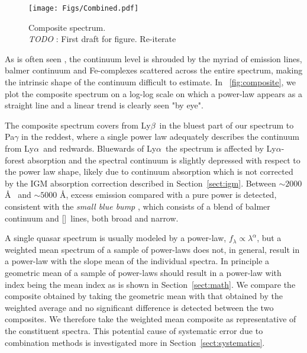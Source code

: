 \documentclass{aa}    %
\newcommand{\figref}[1]{\ref{fig:#1}}
\newcommand{\Fig}[1]{\figurename~\figref{#1}}
\newcommand{\fig}[1]{\Fig{#1}}
\newcommand{\figlabel}[1]{\label{fig:#1}}
\newcommand{\sectionname}{Section}
\newcommand{\Sect}[1]{\sectionname~\ref{sect:#1}}
\newcommand{\sect}[1]{\Sect{#1}}
\newcommand{\lya}{Ly$\alpha$}
\newcommand{\lyb}{Ly$\beta$}
\newcommand{\feii}{[\ion{Fe}{ii}]}
\newcommand{\todo}[3]{{\color{#2}\emph{#1}: #3}}
\newcommand{\jstodo}[1]{\todo{ \\TODO }{green}{#1}}
\begin{document}
 \begin{figure*}[hbtp]
   \centering
   \texttt{[image: Figs/Combined.pdf]}
   \caption[]{Composite spectrum. \jstodo{First draft for figure. Re-iterate}}
  \figlabel{combined}
 \end{figure*}


As is often seen \citep{Elvis2001}, the continuum level is shrouded by the myriad of emission lines, balmer continuum and Fe-complexes scattered across the entire spectrum, making the intrinsic shape of the continuum difficult to estimate. In \fig{composite}, we plot the composite spectrum on a log-log scale on which a power-law appears as a straight line and a linear trend is clearly seen "by eye". 

The composite spectrum covers from \lyb ~in the bluest part of our spectrum to Pa$\gamma$ in the reddest, where a single power law adequately describes the continuum from \lya~and redwards. Bluewards of \lya~the spectrum is affected by \lya-forest absorption and the spectral continuum is slightly depressed with respect to the power law shape, likely due to continuum absorption which is not corrected by the IGM absorption correction described in \sect{igm}. Between $\sim2000$ \AA~ and $\sim5000$ \AA, excess emission compared with a pure power is detected, consistent with  the \textit{small blue bump} \citep{Wills1985}, which consists of a blend of balmer continuum and \feii ~lines, both broad and narrow.

 A single quasar spectrum is usually modeled by a power-law, $f_{\lambda} \propto \lambda^\alpha$, but a weighted mean spectrum of a sample of power-laws does not, in general, result in a power-law with the slope mean of the individual spectra. In principle a geometric mean of a sample of power-laws should result in a power-law with index being the mean index as is shown in \sect{math}. We compare the composite obtained by taking the geometric mean with that obtained by the weighted average and no significant difference is detected between the two composites. We therefore take the  weighted mean composite as representative of the constituent spectra. This potential cause of systematic error due to combination methods is investigated more in \sect{systematics}.
\end{document}
